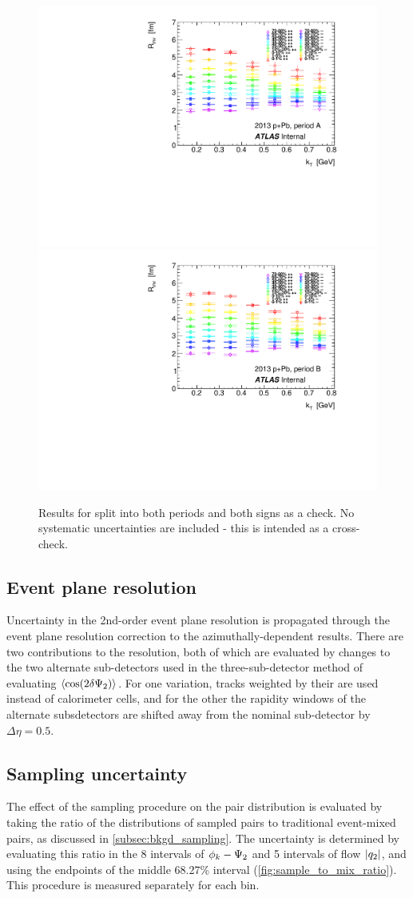 \begin{figure}[t]
\includegraphics[width=.49\linewidth]{qinv_R_vs_kt_periodA.pdf}
\includegraphics[width=.49\linewidth]{qinv_R_vs_kt_periodB.pdf}
\caption{Results for \Rinv split into both periods and both signs as a check.
No systematic uncertainties are included - this is intended as a cross-check.}
\label{fig:fit_inv_R_split}
\end{figure}

\FloatBarrier %

\subsection{Event plane resolution}
Uncertainty in the 2nd-order event plane resolution is propagated through the event plane resolution correction to the azimuthally-dependent results. There are two contributions to the \psit resolution, both of which are evaluated by changes to the two alternate sub-detectors used in the three-sub-detector method of evaluating $\langle \cos(2\delta\Psi_{2}) \rangle$. For one variation, tracks weighted by their \pt are used instead of calorimeter cells, and for the other the rapidity windows of the alternate subsdetectors are shifted away from the nominal sub-detector by $\Delta\eta = 0.5$.

\subsection{Sampling uncertainty}
The effect of the sampling procedure on the pair distribution is evaluated by taking the ratio of the distributions of sampled pairs to traditional event-mixed pairs, as discussed in \cref{subsec:bkgd_sampling}.
The uncertainty is determined by evaluating this ratio in the 8 intervals of $\phi_{k} - \Psi_{2}$ and 5 intervals of flow $|q_{2}|$, and using the endpoints of the middle 68.27\% interval (\cref{fig:sample_to_mix_ratio}).
This procedure is measured separately for each \kt bin.

